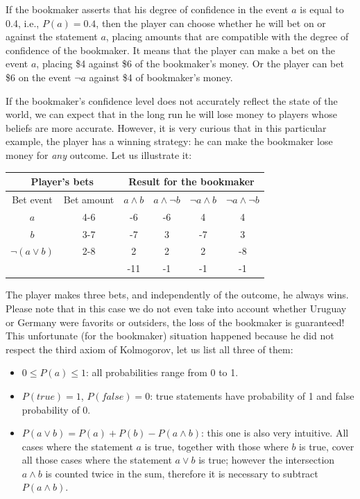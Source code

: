 \documentclass[notitlepage,oneside]{book}
\begin{document}
If the bookmaker asserts that his degree of confidence in the event $a$ is equal to 0.4, i.e., $P(a) = 0.4$, 
then the player can choose whether he will bet on or against the statement $a$,
placing amounts that are compatible with the degree of confidence of the bookmaker.
It means that the player can make a bet on the event $a$, placing \$4 against \$6 of the bookmaker's money.
Or the player can bet \$6 on the event $\neg a$ against \$4 of bookmaker's money.

If the bookmaker's confidence level does not accurately reflect the state of the world, 
we can expect that in the long run he will lose money to players whose beliefs are more accurate.
However, it is very curious that in this particular example, the player has a winning strategy: he can make the bookmaker lose money for \textit{any} outcome.
Let us illustrate it:

\vspace{2mm}
\begin{tabular}{cccccc}
	\multicolumn{2}{c}{Player's bets}  &  \multicolumn{4}{c}{Result for the bookmaker} \\
	\hline
	{\tiny Bet event} & {\tiny Bet amount} & {\tiny $a\wedge b$} & {\tiny $a\wedge \neg b$} &  {\tiny $\neg a\wedge b$} &  {\tiny $\neg a\wedge\neg b$} \\
	\hline
	$a$             & 4-6 & -6 & -6 &  4 &  4 \\
	$b$             & 3-7 & -7 &  3 & -7 &  3 \\
	$\neg(a\vee b)$ & 2-8 &  2 &  2 &  2 & -8 \\
	\hline
	&     &-11 & -1 & -1 & -1
\end{tabular}
\vspace{2mm}

The player makes three bets, and independently of the outcome, he always wins. 
Please note that in this case we do not even take into account whether Uruguay or Germany were favorits or outsiders, 
the loss of the bookmaker is guaranteed! 
This unfortunate (for the bookmaker) situation happened because he did not respect the third axiom of Kolmogorov, let us list all three of them:
\begin{itemize}
\item $0\leq P(a)\leq 1$: all probabilities range from 0 to 1.
\item $P(true)=1$, $P(false) = 0$: true statements have probability of 1 and false probability of 0.
\item $P(a\vee b) = P(a) + P(b) - P(a\wedge b)$: this one is also very intuitive.
All cases where the statement $a$ is true, together with those where $b$ is true,
cover all those cases where the statement $a\vee b$ is true; however the intersection $a\wedge b$ is counted twice in the sum, therefore it is necessary to subtract $P(a\wedge b)$.
\end{itemize}
\end{document}

